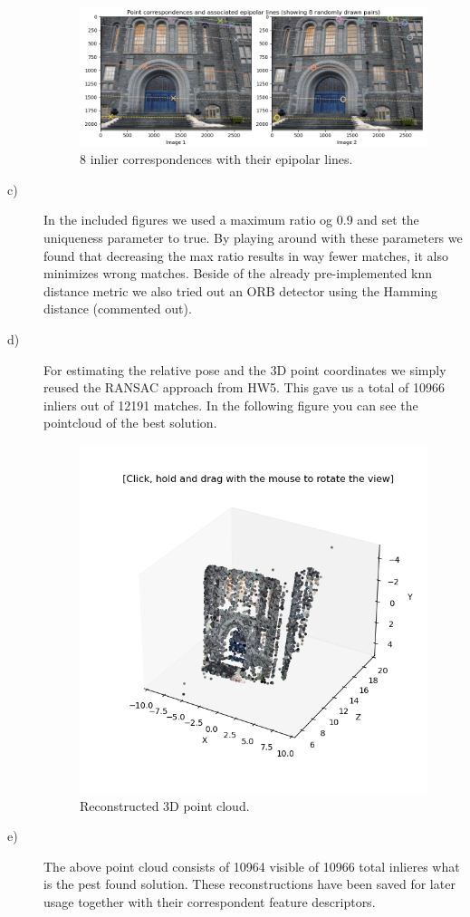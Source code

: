 \documentclass[a4paper]{article} %
\begin{document}
\begin{description}
            \begin{figure}[H]
                \center
                \includegraphics[width= \linewidth]{epipolarLines}
                \caption{8 inlier correspondences with their epipolar lines.}
            \end{figure}
        \item [c)]  In the included figures we used a maximum ratio og 0.9 and set the uniqueness parameter to true.
                    By playing around with these parameters we found that decreasing the max ratio results in way fewer matches, it also minimizes wrong matches.
                    Beside of the already pre-implemented knn distance metric we also tried out an ORB detector using the Hamming distance (commented out).
        \item [d)]  For estimating the relative pose and the 3D point coordinates we simply reused the RANSAC approach from HW5.
                    This gave us a total of 10966 inliers out of 12191 matches.
                    In the following figure you can see the pointcloud of the best solution.
            \begin{figure}[h]
                \center
                \includegraphics[width= 0.7 \linewidth ]{3D_point_cloud}
                \caption{Reconstructed 3D point cloud.}
            \end{figure}
        \item [e)]  The above point cloud consists of 10964 visible of 10966 total inlieres what is the pest found solution.
                    These reconstructions have been saved for later usage together with their correspondent feature descriptors.
    \end{description}
    
\end{document}
